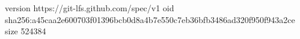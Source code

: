 version https://git-lfs.github.com/spec/v1
oid sha256:a45caa2e600703f01396bcb0d8a4b7e550c7eb36bfb3486ad320f950f943a2ce
size 524384
